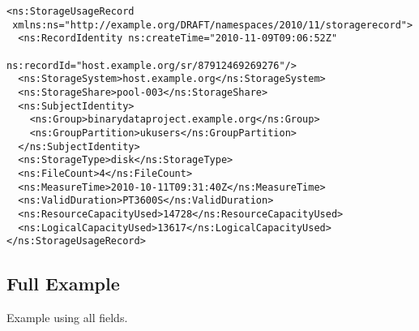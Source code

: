 \begin{verbatim}
<ns:StorageUsageRecord
 xmlns:ns="http://example.org/DRAFT/namespaces/2010/11/storagerecord">
  <ns:RecordIdentity ns:createTime="2010-11-09T09:06:52Z"
                     ns:recordId="host.example.org/sr/87912469269276"/>
  <ns:StorageSystem>host.example.org</ns:StorageSystem>
  <ns:StorageShare>pool-003</ns:StorageShare>
  <ns:SubjectIdentity>
    <ns:Group>binarydataproject.example.org</ns:Group>
    <ns:GroupPartition>ukusers</ns:GroupPartition>
  </ns:SubjectIdentity>
  <ns:StorageType>disk</ns:StorageType>
  <ns:FileCount>4</ns:FileCount>
  <ns:MeasureTime>2010-10-11T09:31:40Z</ns:MeasureTime>
  <ns:ValidDuration>PT3600S</ns:ValidDuration>
  <ns:ResourceCapacityUsed>14728</ns:ResourceCapacityUsed>
  <ns:LogicalCapacityUsed>13617</ns:LogicalCapacityUsed>
</ns:StorageUsageRecord>
\end{verbatim}

\subsection{Full Example}

Example using all fields.

